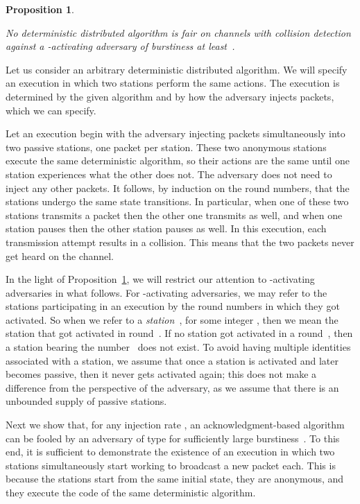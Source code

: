 \documentclass[11pt]{article}
\newcommand{\qed}{\hfill  \smallbreak}
\newenvironment{proof}{\noindent{\bf Proof:}}{\qed}
\newtheorem{proposition}{Proposition}
\begin{document}
\begin{proposition}
\label{proposition:2-activating}

No deterministic distributed algorithm is fair on channels with collision detection against a -activating adversary of burstiness at least~.
\end{proposition}

\begin{proof} 
Let us consider an arbitrary deterministic distributed algorithm.
We will specify an execution in which two stations perform the same actions.
The execution is determined by the given algorithm and by how the adversary injects packets, which we can specify.

Let an execution begin with the adversary injecting packets simultaneously into two passive stations, one packet per station.
These two anonymous stations execute the same deterministic algorithm, so their actions are the same until one station experiences what the other does not.
The adversary does not need to inject any other packets.
It follows, by induction on the round numbers, that the stations undergo the same state transitions.
In particular, when one of these two stations transmits a packet then the other one transmits as well, and when one station pauses then the other station pauses as well.
In this execution, each transmission attempt results in a collision.
This means that the two packets never get heard on the channel.
\end{proof}

In the light of Proposition~\ref{proposition:2-activating}, we will restrict our attention to -activating adversaries in what follows.
For -activating adversaries, we may refer to the stations participating in an execution by the round numbers in which they got activated.
So when we refer to a \emph{station~}, for some integer , then we mean the station that got activated in round~.
If no station got activated in a round~, then a station bearing the number~ does not exist.
To avoid having multiple identities associated with a station, we assume that once a station is activated and later becomes passive, then it never gets activated again; this does not make a difference from the perspective of the adversary, as we assume that there is an unbounded supply of passive stations.

Next we show that, for any injection rate , an acknowledgment-based algorithm can be fooled by an adversary of type  for sufficiently large burstiness~.
To this end, it is sufficient to demonstrate the existence of an execution in which two stations simultaneously start working to broadcast a new packet each.
This is because the stations start from the same initial state, they are anonymous, and they  execute the code of the same deterministic algorithm.
\end{document}
